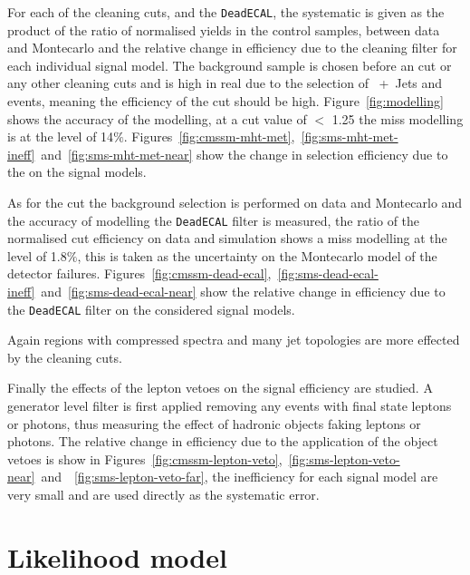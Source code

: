 For each of the cleaning cuts, \Rmiss and the \texttt{DeadECAL}, the 
systematic is given as the product of the ratio of normalised yields in the 
control samples, between data and Montecarlo and the relative change in 
efficiency due to the cleaning filter for each individual signal model. The 
background sample is chosen before an \alt cut or any other cleaning cuts and 
is high in real \MET due to the selection of \HepProcess{\PW}~+~Jets and 
\HepProcess{\Ptop\APtop} events, meaning the efficiency of the \Rmiss cut 
should be high. Figure~\ref{fig:modelling} shows the accuracy of the \Rmiss 
modelling, at a cut value of \Rmiss $<$ 1.25 the miss modelling is at the level 
of 14$\%$. Figures~\ref{fig:cmssm-mht-met},~\ref{fig:sms-mht-met-ineff}~and~\ref{fig:sms-mht-met-near} show the change in selection efficiency due to the \Rmiss on the 
signal models.

As for the \Rmiss cut the background selection is performed on data and 
Montecarlo and the accuracy of modelling the \texttt{DeadECAL} filter is 
measured, the ratio of the normalised cut efficiency on data and simulation 
shows a miss modelling at the level of 1.8$\%$, this is taken as the 
uncertainty on the Montecarlo model of the detector failures. 
Figures~\ref{fig:cmssm-dead-ecal},~\ref{fig:sms-dead-ecal-ineff}~and~\ref{fig:sms-dead-ecal-near} show the relative change in efficiency due to the 
\texttt{DeadECAL} filter on the considered signal models.

Again regions with compressed spectra and many jet topologies are more effected 
by the cleaning cuts.

Finally the effects of the lepton vetoes on the signal efficiency are studied. 
A generator level filter is first applied removing any events with final state 
leptons or photons, thus measuring the effect of hadronic objects faking 
leptons or photons. The relative change in efficiency due to the application of 
the object vetoes is show in 
Figures~\ref{fig:cmssm-lepton-veto},~\ref{fig:sms-lepton-veto-near}~and~~\ref{fig:sms-lepton-veto-far}, the inefficiency for each signal model are very small 
and are used directly as the systematic error.






\section{Likelihood model} %
\label{sec:likelihood_model}
